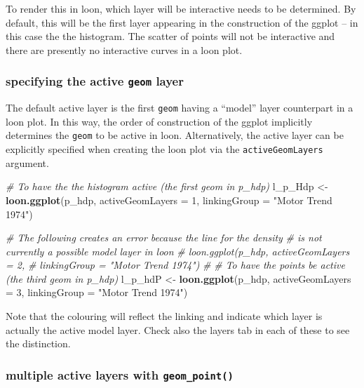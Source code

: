 \documentclass[]{article}
\newenvironment{Shaded}{\begin{snugshade}}{\end{snugshade}}
\newcommand{\KeywordTok}[1]{\textcolor[rgb]{0.13,0.29,0.53}{\textbf{#1}}}
\newcommand{\DataTypeTok}[1]{\textcolor[rgb]{0.13,0.29,0.53}{#1}}
\newcommand{\DecValTok}[1]{\textcolor[rgb]{0.00,0.00,0.81}{#1}}
\newcommand{\StringTok}[1]{\textcolor[rgb]{0.31,0.60,0.02}{#1}}
\newcommand{\CommentTok}[1]{\textcolor[rgb]{0.56,0.35,0.01}{\textit{#1}}}
\newcommand{\NormalTok}[1]{#1}
\begin{document}
To render this in loon, which layer will be interactive needs to be
determined. By default, this will be the first layer appearing in the
construction of the ggplot -- in this case the the histogram. The
scatter of points will not be interactive and there are presently no
interactive curves in a loon plot.

\subsubsection{\texorpdfstring{specifying the active \texttt{geom}
layer}{specifying the active geom layer}}\label{specifying-the-active-geom-layer}

The default active layer is the first \texttt{geom} having a ``model''
layer counterpart in a loon plot. In this way, the order of construction
of the ggplot implicitly determines the \texttt{geom} to be active in
loon. Alternatively, the active layer can be explicitly specified when
creating the loon plot via the \texttt{activeGeomLayers} argument.

\begin{Shaded}
\begin{Highlighting}[]
\CommentTok{# To have the the histogram active (the first geom in p_hdp)}
\NormalTok{l_p_Hdp <-}\StringTok{ }\KeywordTok{loon.ggplot}\NormalTok{(p_hdp, }\DataTypeTok{activeGeomLayers =} \DecValTok{1}\NormalTok{,}
                       \DataTypeTok{linkingGroup =} \StringTok{"Motor Trend 1974"}\NormalTok{)}

\CommentTok{# The following creates an error because the line for the density}
\CommentTok{# is not currently a possible model layer in loon}
\CommentTok{# loon.ggplot(p_hdp, activeGeomLayers = 2,}
\CommentTok{#              linkingGroup = "Motor Trend 1974")}
\CommentTok{# }
\CommentTok{# To have the points be active (the third geom in p_hdp)}
\NormalTok{l_p_hdP <-}\StringTok{ }\KeywordTok{loon.ggplot}\NormalTok{(p_hdp, }\DataTypeTok{activeGeomLayers =} \DecValTok{3}\NormalTok{,}
                       \DataTypeTok{linkingGroup =} \StringTok{"Motor Trend 1974"}\NormalTok{)}
\end{Highlighting}
\end{Shaded}

Note that the colouring will reflect the linking and indicate which
layer is actually the active model layer. Check also the layers tab in
each of these to see the distinction.

\subsubsection{\texorpdfstring{multiple active layers with
\texttt{geom\_point()}}{multiple active layers with geom\_point()}}\label{multiple-active-layers-with-geom_point}
\end{document}

